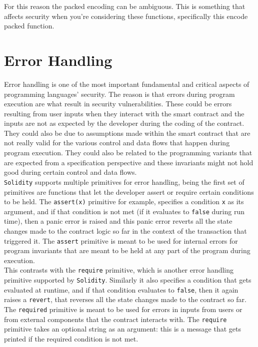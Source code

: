 For this reason the packed encoding can be ambiguous. This is something that affects security when you're considering these functions, specifically this encode packed function.

\section{Error Handling}
Error handling is one of the most important fundamental and critical aspects of programming languages' security. The reason is that errors during program execution are what result in security vulnerabilities. These could be errors resulting from user inputs when they interact with the smart contract and the inputs are not as expected by the developer during the coding of the contract. They could also be due to assumptions made within the smart contract that are not really valid for the various control and data flows that happen during program execution. They could also be related to the programming variants that are expected from a specification perspective and these invariants might not hold good during certain control and data flows.\\

\texttt{Solidity} supports multiple primitives for error handling, being the first set of primitives are functions that let the developer assert or require certain conditions to be held. The \texttt{assert(x)} primitive for example, specifies a condition \texttt{x} as its argument, and if that condition is not met (if it evaluates to \texttt{false} during run time), then a panic error is raised and this panic error reverts all the state changes made to the contract logic so far in the context of the transaction that triggered it. The \texttt{assert} primitive is meant to be used for internal errors for program invariants that are meant to be held at any part of the program during execution.\\

This contrasts with the \texttt{require} primitive, which is another error handling primitive supported by \texttt{Solidity}. Similarly it also specifies a condition that gets evaluated at runtime, and if that condition evaluates to \texttt{false}, then it again raises a \texttt{revert}, that reverses all the state changes made to the contract so far. The \texttt{required} primitive is meant to be used for errors in inputs from users or from external components that the contract interacts with. The \texttt{require} primitive takes an optional string as an argument: this is a message that gets printed if the required condition is not met.\\

